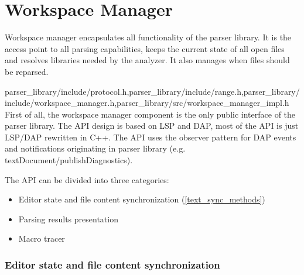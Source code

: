 \chapter{Workspace Manager}
\label{ws_manager}
Workspace manager encapsulates all functionality of the parser library. It is the access point to all parsing capabilities, keeps the current state of all open files and resolves libraries needed by the analyzer. It also manages when files should be reparsed.


{parser\_library/include/protocol.h,parser\_library/include/range.h,parser\_library/include/workspace\_manager.h,parser\_library/src/workspace\_manager\_impl.h}
First of all, the workspace manager component is the only public interface of the parser library. The API design is based on LSP and DAP, most of the API is just LSP/DAP rewritten in C++. The API uses the observer pattern for DAP events and notifications originating in parser library (e.g. textDocument/publishDiagnostics).

The API can be divided into three categories:
\begin{itemize}
	\item Editor state and file content synchronization (\cref{text_sync_methods})
	\item Parsing results presentation 
	\item Macro tracer
\end{itemize}

\subsection{Editor state and file content synchronization}

